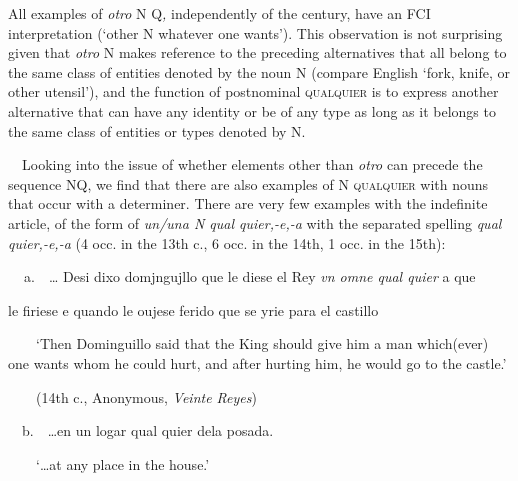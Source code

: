 \begin{styleStandard}
All examples of \textit{otro }N Q\textit{,} independently of the century, have an FCI interpretation (‘other N whatever one wants’). This observation is not surprising given that \textit{otro }N\textit{ }makes reference to the preceding alternatives that all belong to the same class of entities denoted by the noun N (compare English ‘fork, knife, or other utensil’), and the function of postnominal \textsc{qualquier} is to express another alternative that can have any identity or be of any type as long as it belongs to the same class of entities or types denoted by N.
\end{styleStandard}

\begin{styleStandard}
\ \ Looking into the issue of whether elements other than \textit{otro} can precede the sequence NQ, we find that there are also examples of N \textsc{qualquier} with nouns that occur with a determiner. There are very few examples with the indefinite article, of the form of \textit{un/una N qual quier,-e,-a} with the separated spelling \textit{qual quier,-e,-a} (4 occ. in the 13th c., 6 occ. in the 14th, 1 occ. in the 15th):
\end{styleStandard}

\begin{styleStandard}
\textbf{\ \ }a.\ \ … Desi dixo domjngujllo que le diese el Rey \textit{vn omne qual quier} a que
\end{styleStandard}

\begin{styleStandard}
le firiese e quando le oujese ferido que se yrie para el castillo 
\end{styleStandard}

\begin{styleStandard}
\ \ \ \ ‘Then Dominguillo said that the King should give him a man which(ever) one wants whom he could hurt, and after hurting him, he would go to the castle.’
\end{styleStandard}

\begin{styleStandard}
\ \ \ \ (14th c., Anonymous, \textit{Veinte Reyes})
\end{styleStandard}

\begin{styleStandard}
\ \ b.\ \ …en un logar qual quier dela posada. 
\end{styleStandard}

\begin{styleStandard}
\ \ \ \ ‘…at any place in the house.’
\end{styleStandard}

